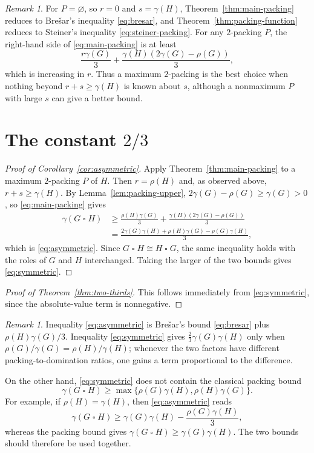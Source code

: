 \documentclass[10pt]{amsart}
\theoremstyle{remark}
\newtheorem{remark}[theorem]{Remark}
\begin{document}
\begin{remark}\label{rem:choice-P}
For $P=\varnothing$, so $r=0$ and $s=\gamma(H)$,
Theorem~\ref{thm:main-packing} reduces to Bre\v{s}ar's inequality
\eqref{eq:bresar}, and Theorem~\ref{thm:packing-function} reduces to Steiner's
inequality \eqref{eq:steiner-packing}. For any $2$-packing $P$, the right-hand
side of \eqref{eq:main-packing} is at least
\[
 \frac{r\gamma(G)}3
 +\frac{\gamma(H)(2\gamma(G)-\rho(G))}3,
\]
which is increasing in $r$. Thus a maximum $2$-packing is the best choice when
nothing beyond $r+s\geq\gamma(H)$ is known about $s$, although a nonmaximum
$P$ with large $s$ can give a better bound.
\end{remark}

\section{The constant \texorpdfstring{$2/3$}{2/3}}\label{sec:constant}

\begin{proof}[Proof of Corollary~\ref{cor:asymmetric}]
Apply Theorem~\ref{thm:main-packing} to a maximum $2$-packing $P$ of $H$.
Then $r=\rho(H)$ and, as observed above, $r+s\geq\gamma(H)$. By
Lemma~\ref{lem:packing-upper},
$2\gamma(G)-\rho(G)\geq\gamma(G)>0$, so \eqref{eq:main-packing} gives
\begin{align*}
 \gamma(G\mathbin{\square}H)
 &\geq\frac{\rho(H)\gamma(G)}3
 +\frac{\gamma(H)(2\gamma(G)-\rho(G))}3\\
 &=\frac{2\gamma(G)\gamma(H)+\rho(H)\gamma(G)-\rho(G)\gamma(H)}3,
\end{align*}
which is \eqref{eq:asymmetric}. Since
$G\mathbin{\square}H\cong H\mathbin{\square}G$, the same inequality holds
with the roles of $G$ and $H$ interchanged. Taking the larger of the two bounds
gives \eqref{eq:symmetric}.
\end{proof}

\begin{proof}[Proof of Theorem~\ref{thm:two-thirds}]
This follows immediately from \eqref{eq:symmetric}, since the absolute-value
term is nonnegative.
\end{proof}

\begin{remark}\label{rem:comparison}
Inequality \eqref{eq:asymmetric} is Bre\v{s}ar's bound
\eqref{eq:bresar} plus $\rho(H)\gamma(G)/3$. Inequality
\eqref{eq:symmetric} gives 
$\tfrac23\gamma(G)\gamma(H)$ only when
$\rho(G)/\gamma(G)=\rho(H)/\gamma(H)$; whenever the two factors have different
packing-to-domination ratios, one gains a term proportional to the difference.

On the other hand, \eqref{eq:symmetric} does not contain the classical packing
bound
\[
 \gamma(G\mathbin{\square}H)
 \geq\max\{\rho(G)\gamma(H),\rho(H)\gamma(G)\}.
\]
For example, if $\rho(H)=\gamma(H)$, then \eqref{eq:asymmetric} reads
\[
 \gamma(G\mathbin{\square}H)
 \geq\gamma(G)\gamma(H)-\frac{\rho(G)\gamma(H)}3,
\]
whereas the packing bound gives
$\gamma(G\mathbin{\square}H)\geq\gamma(G)\gamma(H)$. The two bounds should
therefore be used together.
\end{remark}
\end{document}
